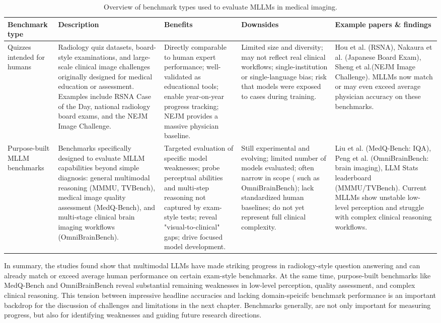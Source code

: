 \documentclass{imc-inf}
\begin{document}
\begin{table}[ht!]
\centering
\small
\caption{Overview of benchmark types used to evaluate MLLMs in medical imaging.}
\label{tab:benchmark-types}
\begin{tabular}{p{1.8cm} p{3.5cm} p{2.75cm} p{2.75cm} p{3cm}}
\hline
\textbf{Benchmark type} & \textbf{Description} & \textbf{Benefits} & \textbf{Downsides} & \textbf{Example papers \& findings} \\
\hline
Quizzes intended for humans
& Radiology quiz datasets, board-style examinations, and large-scale clinical image challenges originally designed for medical education or assessment. Examples include RSNA Case of the Day, national radiology board exams, and the NEJM Image Challenge.
& Directly comparable to human expert performance; well-validated as educational tools; enable year-on-year progress tracking; NEJM provides a massive physician baseline.
& Limited size and diversity; may not reflect real clinical workflows; single-institution or single-language bias; risk that models were exposed to cases during training.
& Hou et al. (RSNA)\cite{hou2025one}, Nakaura et al. (Japanese Board Exam)\cite{nakaura2025performance}, Sheng et al.(NEJM Image Challenge)\cite{sheng2026multimodal}. MLLMs now match or may even exceed average physician accuracy on these benchmarks. \\
\hline
Purpose-built MLLM benchmarks
& Benchmarks specifically designed to evaluate MLLM capabilities beyond simple diagnosis: general multimodal reasoning (MMMU, TVBench), medical image quality assessment (MedQ-Bench), and multi-stage clinical brain imaging workflows (OmniBrainBench).
& Targeted evaluation of specific model weaknesses; probe perceptual abilities and multi-step reasoning not captured by exam-style tests; reveal "visual-to-clinical" gaps; drive focused model development.
& Still experimental and evolving; limited number of models evaluated; often narrow in scope ( such as OmniBrainBench); lack standardized human baselines; do not yet represent full clinical complexity.
& Liu et al. (MedQ-Bench: IQA)\cite{liu2025medq}, Peng et al. (OmniBrainBench: brain imaging)\cite{peng2026omnibrainbench}, LLM Stats leaderboard (MMMU/TVBench)\cite{llmstats2026}. Current MLLMs show unstable low-level perception and struggle with complex clinical reasoning workflows. \\
\hline
\end{tabular}
\end{table}

In summary, the studies found show that multimodal LLMs have made striking progress in radiology-style question answering and can already match or exceed average human performance on certain exam-style benchmarks.
At the same time, purpose-built benchmarks like MedQ-Bench and OmniBrainBench reveal substantial remaining weaknesses in low-level perception, quality assessment, and complex clinical reasoning.
This tension between impressive headline accuracies and lacking domain-speicifc benchmark performance is an important backdrop for the discussion of challenges and limitations in the next chapter.
Benchmarks generally, are not only important for measuring progress, but also for identifying weaknesses and guiding future research directions.
\end{document}
